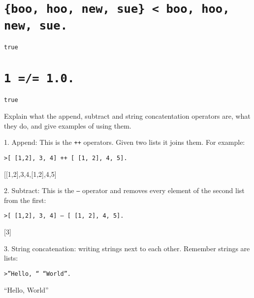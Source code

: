 \begin{questions}
\begin{parts}
        \part[1] {\tt \{boo, hoo, new, sue\} < {boo, hoo, new, sue}. }
        \begin{solution}
            {\tt true}
        \end{solution}
        \part[1] {\tt 1 =/= 1.0.}
        \begin{solution}
            {\tt true}
        \end{solution}
    \end{parts}

    \question[10] Explain what the append, subtract and string
    concatentation operators are, what they do, and give examples of
    using them.
    \begin{solution}
        1. Append: This is the {\tt ++} operators. Given two lists it
           joins them. For example:

           {\tt >[ [1,2], 3, 4] ++ [ [1, 2], 4, 5].

                 [[1,2],3,4,[1,2],4,5] }

       2. Subtract: This is the {\tt --} operator and removes every
          element of the second list from the first:

          {\tt >[ [1,2], 3, 4] -- [ [1, 2], 4, 5].

               [3] }

       3. String concatenation: writing strings next to each
          other. Remember strings are lists:

          {\tt >''Hello, `` ``World''.
              
               ``Hello, World'' }
    \end{solution}

   
\end{questions}


